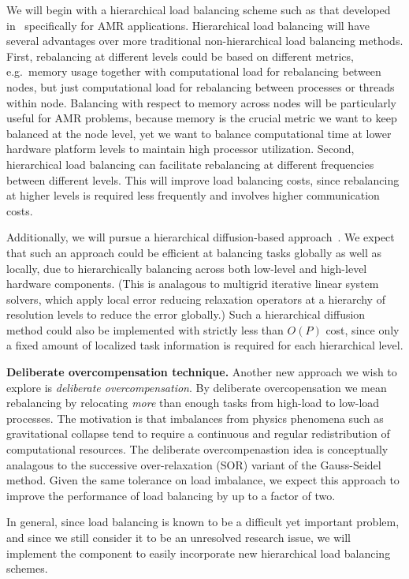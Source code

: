 \documentclass[10pt,twocolumn]{article}
\begin{document}
We will begin with a hierarchical load balancing scheme such as that
developed in~\cite{LaTa06} specifically for AMR applications.
Hierarchical load balancing will have several advantages over more
traditional non-hierarchical load balancing methods.  First,
rebalancing at different levels could be based on different metrics,
e.g.~memory usage together with computational load for rebalancing
between nodes, but just computational load for rebalancing between
processes or threads within node.  Balancing with respect to memory
across nodes will be particularly useful for AMR problems, because
memory is the crucial metric we want to keep balanced at the node
level, yet we want to balance computational time at lower hardware
platform levels to maintain high processor utilization.  Second,
hierarchical load balancing can facilitate rebalancing at different
frequencies between different levels.  This will improve load
balancing costs, since rebalancing at higher levels is required less
frequently and involves higher communication costs.

Additionally, we will pursue a hierarchical diffusion-based
approach~\cite{ScKa97}.  We expect that such an approach could be
efficient at balancing tasks globally as well as locally, due to
hierarchically balancing across both low-level and high-level hardware
components.  (This is analagous to multigrid iterative linear system
solvers, which apply local error reducing relaxation operators at a
hierarchy of resolution levels to reduce the error globally.)  Such a
hierarchical diffusion method could also be implemented with strictly
less than $O(P)$ cost, since only a fixed amount of localized task
information is required for each hierarchical level.

\textbf{Deliberate overcompensation technique.}
%
Another new approach we wish to explore is \textit{deliberate
  overcompensation}.  By deliberate overcopensation we mean
rebalancing by relocating \textit{more} than enough tasks from
high-load to low-load processes.  The motivation is that imbalances
from physics phenomena such as gravitational collapse tend to require
a continuous and regular redistribution of computational resources.
The deliberate overcompenastion idea is conceptually analagous to the
successive over-relaxation (SOR) variant of the Gauss-Seidel method.
Given the same tolerance on load imbalance, we expect this approach to
improve the performance of load balancing by up to a factor of two.

In general, since load balancing is known to be a difficult yet
important problem, and since we still consider it to be an unresolved
research issue, we will implement the  component to
easily incorporate new hierarchical load balancing schemes.
\end{document}
